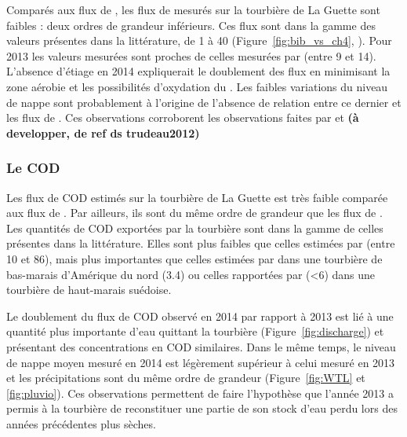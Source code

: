 Comparés aux flux de \coo, les flux de \chh mesurés sur la tourbière de La Guette sont faibles : deux ordres de grandeur inférieurs.
Ces flux sont dans la gamme des valeurs présentes dans la littérature, de 1 à \SI{40}{\gcma} (Figure~\ref{fig:bib_vs_ch4},  \citep{nilsson2001}).
Pour 2013 les valeurs mesurées sont proches de celles mesurées par \citet{nilsson2008} (entre 9 et \SI{14}{\gcma}).
L'absence d'étiage en 2014 expliquerait le doublement des flux en minimisant la zone aérobie et les possibilités d'oxydation du \chh \citep{lai2009}.
Les faibles variations du niveau de nappe sont probablement à l'origine de l'absence de relation entre ce dernier et les flux de \chh.
Ces observations corroborent les observations faites par \citet{trudeau2012} et \textbf{(à developper, de ref ds trudeau2012)}


\subsubsection{Le COD}

Les flux de COD estimés sur la tourbière de La Guette est très faible comparée aux flux de \coo.
Par ailleurs, ils sont du même ordre de grandeur que les flux de \chh.
Les quantités de COD exportées par la tourbière sont dans la gamme de celles présentes dans la littérature.
Elles sont plus faibles que celles estimées par \citet{worrall2009} (entre 10 et \SI{86}{\gcma}), mais plus importantes que celles estimées par \citet{carroll1997} dans une tourbière de bas-marais d’Amérique du nord (\SI{3.4}{\gcma}) ou celles rapportées par \citet{waddington2000} (<\SI{6}{\gcma}) dans une tourbière de haut-marais suédoise.

Le doublement du flux de COD observé en 2014 par rapport à 2013 est lié à une quantité plus importante d'eau quittant la tourbière (Figure~\ref{fig:discharge}) et présentant des concentrations en COD similaires.
Dans le même temps, le niveau de nappe moyen mesuré en 2014 est légèrement supérieur à celui mesuré en 2013 et les précipitations sont du même ordre de grandeur (Figure~\ref{fig:WTL} et \ref{fig:pluvio}).
Ces observations permettent de faire l'hypothèse que l'année 2013 a permis à la tourbière de reconstituer une partie de son stock d'eau perdu lors des années précédentes plus sèches.



